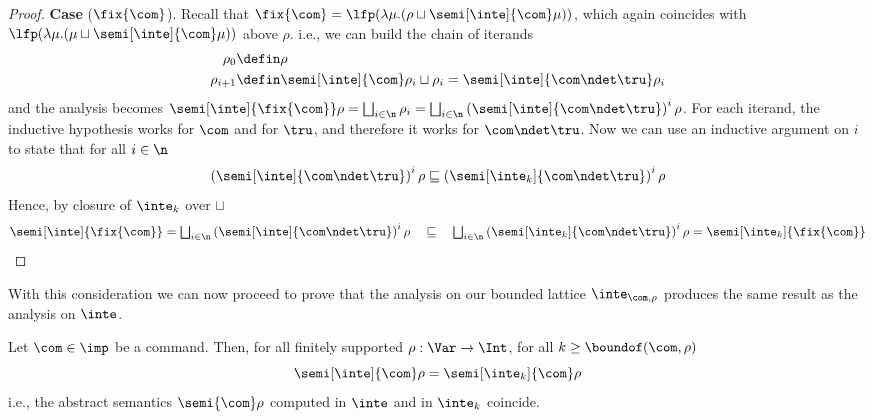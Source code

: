 \begin{proof}
  \medskip

  \noindent
  \textbf{Case} (\(\fix{\com}\)).
  Recall that
  \(\fix{\com} = {\lfp(\lambda \mu . (\rho \sqcup
    \semi[\inte]{\com}\mu))}\), which again coincides with
  \({\lfp(\lambda \mu . (\mu \sqcup \semi[\inte]{\com}\mu))}\) above
  \(\rho\). i.e., we can build the chain of iterands
  \begin{align*}
    \rho_0 & \defin \rho \\
    \rho_{i+1} & \defin \semi[\inte]{\com}\rho_i \sqcup \rho_i = \semi[\inte]{\com \ndet \tru}\rho_i
  \end{align*}
  and the analysis becomes
  \({\semi[\inte]{\fix{\com}}\rho} =
  {\textstyle\bigsqcup_{i\in\n}\rho_i} =
  {\textstyle\bigsqcup_{i\in\n}\left(\semi[\inte]{\com \ndet
        \tru}\right)^i\rho}\).  For each iterand, the inductive
  hypothesis works for \(\com\) and for \(\tru\), and therefore it
  works for \(\com \ndet \tru\). Now we can use an inductive argument
  on \(i\) to state that for all \(i \in\n\)
  \begin{equation*}
    {\left(\semi[\inte]{\com\ndet\tru}\right)^i\rho} \sqsubseteq {\left(\semi[\inte_k]{\com\ndet\tru}\right)^i\rho}
  \end{equation*}
  Hence, by closure of \(\inte_k\) over \(\sqcup\)
  \begin{equation*}
    {\semi[\inte]{\fix{\com}}} =
    {\textstyle\bigsqcup_{i\in\n}\left(\semi[\inte]{\com\ndet\tru}\right)^i \rho}
    \quad \sqsubseteq \quad
    {\textstyle\bigsqcup_{i\in\n}\left(\semi[\inte_k]{\com\ndet\tru}\right)^i \rho} =
    {\semi[\inte_k]{\fix{\com}}}
  \end{equation*}

\end{proof}
With this consideration we can now proceed to prove that the analysis
on our bounded lattice \(\inte_{\com,\rho}\) produces the same result
as the analysis on \(\inte\).



\begin{lemma}
  Let \(\com\in \imp\) be a command. Then, for all finitely supported
  \(\rho : \Var \to \Int\), for all \(k\geq \boundof(\com,\rho)\)
  \begin{equation*}
    \semi[\inte]{\com}\rho = \semi[\inte_k]{\com}\rho
  \end{equation*}
  i.e., the abstract semantics \(\semi{\com} \rho\)
  computed in \(\inte\) and in \(\inte_k\) coincide.
\end{lemma}

